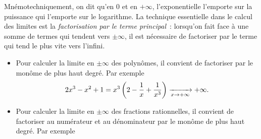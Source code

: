 \documentclass{magnoliaold}
\begin{document}
\begin{remarques}
\remarque Mnémotechniquement, on dit qu'en 0 et en $+\infty$, l'exponentielle
  l'emporte sur la puissance qui l'emporte sur le logarithme.
\remarque La technique essentielle dans le calcul des limites est la
  \emph{factorisation par le terme principal}~: lorsqu'on fait face à une somme de termes
  qui tendent vers $\pm\infty$, il est nécessaire de factoriser par le terme qui tend
  \og le plus vite vers l'infini\fg. 
\begin{itemize}
\item Pour calculer la limite en $\pm\infty$ des polynômes, il convient de
  factoriser par le monôme de plus haut degré. Par exemple
  $$2x^3-x^2+1=x^3\left(2-\frac{1}{x}+\frac{1}{x^3}\right)\xrightarrow[x\rightarrow +\infty]{}+\infty.$$
\item Pour calculer la limite en $\pm\infty$ des fractions rationnelles, il
  convient de factoriser au numérateur et au dénominateur par le monôme de
  plus haut degré. Par exemple
  

\end{itemize}
\end{remarques}
\end{document}
